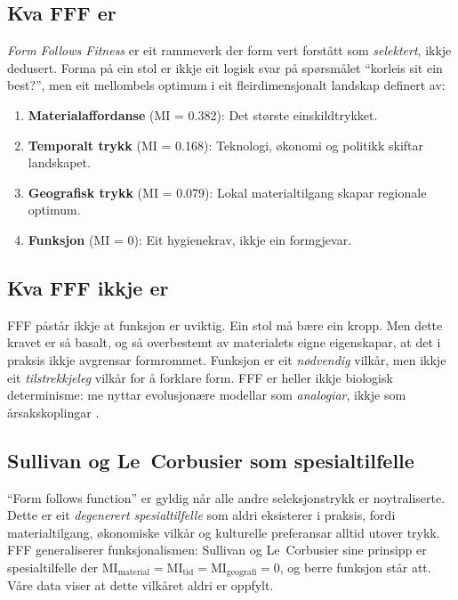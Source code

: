 \documentclass[12pt,a4paper]{article}
\begin{document}
\subsection{Kva FFF er}

\emph{Form Follows Fitness} er eit rammeverk der form vert forst\aa{}tt som \emph{selektert}, ikkje dedusert. Forma p\aa{} ein stol er ikkje eit logisk svar p\aa{} sp\o{}rsm\aa{}let \enquote{korleis sit ein best?}, men eit mellombels optimum i eit fleirdimensjonalt landskap \citep{wright1932, kauffman1993} definert av:

\begin{enumerate}[nosep]
    \item \textbf{Materialaffordanse} (MI = 0.382): Det st\o{}rste einskildtrykket.
    \item \textbf{Temporalt trykk} (MI = 0.168): Teknologi, \o{}konomi og politikk skiftar landskapet.
    \item \textbf{Geografisk trykk} (MI = 0.079): Lokal materialtilgang skapar regionale optimum.
    \item \textbf{Funksjon} (MI = 0): Eit hygienekrav, ikkje ein formgjevar.
\end{enumerate}

\subsection{Kva FFF ikkje er}

FFF p\aa{}st\aa{}r ikkje at funksjon er uviktig. Ein stol m\aa{} b\ae{}re ein kropp. Men dette kravet er s\aa{} basalt, og s\aa{} overbestemt av materialets eigne eigenskapar, at det i praksis ikkje avgrensar formrommet. Funksjon er eit \emph{n\o{}dvendig} vilk\aa{}r, men ikkje eit \emph{tilstrekkjeleg} vilk\aa{}r for \aa{} forklare form. FFF er heller ikkje biologisk determinisme: me nyttar evolusjon\ae{}re modellar som \emph{analogiar}, ikkje som \aa{}rsakskoplingar \citep{henrich2016}.

\subsection{Sullivan og Le~Corbusier som spesialtilfelle}

\enquote{Form follows function} er gyldig n\aa{}r alle andre seleksjonstrykk er noytraliserte. Dette er eit \emph{degenerert spesialtilfelle} som aldri eksisterer i praksis, fordi materialtilgang, \o{}konomiske vilk\aa{}r og kulturelle preferansar alltid utover trykk. FFF generaliserer funksjonalismen: Sullivan og Le~Corbusier sine prinsipp er spesialtilfelle der $\mathrm{MI_{material}} = \mathrm{MI_{tid}} = \mathrm{MI_{geografi}} = 0$, og berre funksjon st\aa{}r att. V\aa{}re data viser at dette vilk\aa{}ret aldri er oppfylt.
\end{document}
